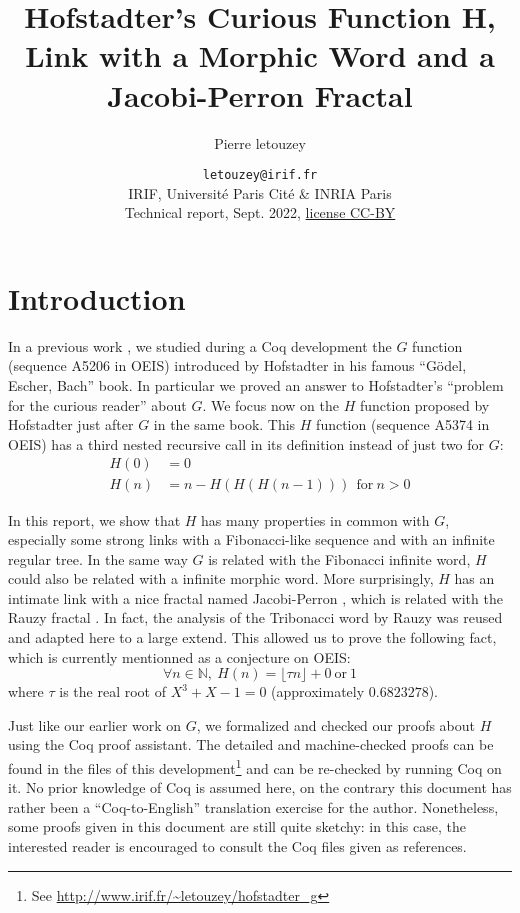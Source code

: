 \documentclass[a4paper,11pt]{article}
\title{Hofstadter's Curious Function H,
       Link with a Morphic Word and a Jacobi-Perron Fractal}
\author{Pierre letouzey}
\date{\small
{\tt letouzey@irif.fr}\\
IRIF, Université Paris Cité \& INRIA Paris\\
Technical report, Sept. 2022, \href{http://creativecommons.org/licenses/by/4.0/}{license CC-BY}
}
\begin{document}
\newtheorem{theorem}{Theorem}
\newtheorem{definition}{Definition}
\maketitle

\newcommand{\TODO}{{\color{red} TODO}\ }

\newcommand{\docgen}[2]{\href{http://www.irif.fr/~letouzey/hofstadter_g/doc/#1.html#2}{\tt #1.v}}
\newcommand{\doc}[1]{\docgen{#1}{}}
\newcommand{\doclab}[2]{\docgen{#1}{\##2}}
\newcommand{\FG}{\ensuremath{\overline{G}}}
\newcommand{\fibrest}{\ensuremath{\Sigma A_i}}
\newcommand{\flip}{\textit{flip}}
\newcommand{\depth}{\textit{depth}}

\section{Introduction}
In a previous work \cite{??}, we studied during a Coq development the
$G$ function (sequence A5206 in OEIS\cite{OEIS-G})
introduced by Hofstadter in his famous ``Gödel, Escher, Bach'' book\cite{GEB}.
In particular we proved an answer to Hofstadter's ``problem for the curious reader'' about $G$.
We focus now on the $H$ function proposed by
Hofstadter just after $G$ in the same book. This $H$
function (sequence A5374 in OEIS\cite{OEIS-H})
has a third nested recursive call in its definition instead of just
two for $G$:
\begin{align*}
  H(0) &= 0 \\
  H(n) &= n - H(H(H(n-1))) ~~ \text{for}~n>0
\end{align*}

In this report, we show that $H$ has many properties in common with $G$,
especially some strong links with a Fibonacci-like sequence and with
an infinite regular tree. In the same way $G$ is related with the
Fibonacci infinite word, $H$ could also be related with a infinite
morphic word. More surprisingly, $H$ has an intimate link with a nice fractal
named Jacobi-Perron \cite{??}, which is related with the Rauzy fractal
\cite{??}. In fact, the analysis of the Tribonacci word by Rauzy
\cite{??} was reused and adapted here to a large extend. This allowed
us to prove the following fact, which is currently mentionned as a
conjecture on OEIS:
$$\forall n\in\mathbb{N},~H(n) = \lfloor \tau n \rfloor + 0~\text{or}~1 $$
where $\tau$ is the real root of $X^3+X-1=0$ (approximately $0.6823278$).

Just like our earlier work on $G$, we formalized and checked our
proofs about $H$ using the Coq proof assistant\cite{Coq}.
The detailed and machine-checked proofs can be found in the files
of this development\footnote{See \url{http://www.irif.fr/~letouzey/hofstadter_g}}
and can be re-checked by running Coq \cite{Coq} %
on it.
No prior knowledge of Coq is assumed here, on the contrary this
document has rather been a ``Coq-to-English'' translation
exercise for the author. Nonetheless, some proofs given in this
document are still quite sketchy: in this case, the interested
reader is encouraged to consult the Coq files given as references.
\end{document}
